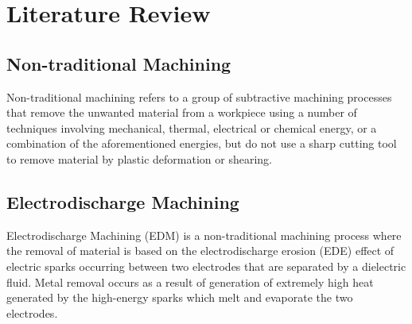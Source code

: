 \chapter{Literature Review}
\lhead{\leftmark}
\label{sec:review}
%
\section{Non-traditional Machining}
Non-traditional machining refers to a group of subtractive machining processes that remove the unwanted material from a workpiece using a number of techniques involving mechanical, thermal, electrical or chemical energy, or a combination of the aforementioned energies, but do not use a sharp cutting tool to remove material by plastic deformation or shearing.

\section{Electrodischarge Machining}
Electrodischarge Machining (EDM) is a non-traditional machining process where the removal of material is based on the electrodischarge erosion (EDE) effect of electric sparks occurring between two electrodes that are separated by a dielectric fluid. Metal removal occurs as a result of generation of extremely high heat generated by the high-energy sparks which melt and evaporate the two electrodes.
